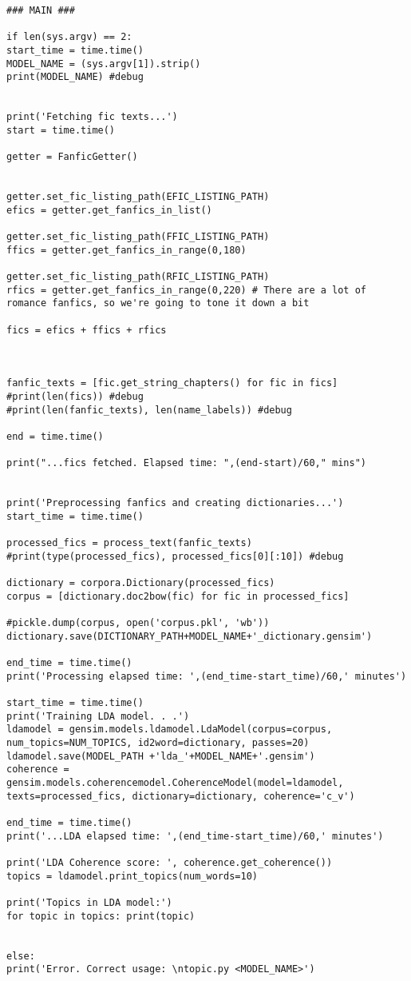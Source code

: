 \documentclass{pre-tfg}
\begin{document}
\begin{lstlisting}[style=consola]
### MAIN ###

if len(sys.argv) == 2:
start_time = time.time()
MODEL_NAME = (sys.argv[1]).strip()
print(MODEL_NAME) #debug


print('Fetching fic texts...')
start = time.time()

getter = FanficGetter()


getter.set_fic_listing_path(EFIC_LISTING_PATH)
efics = getter.get_fanfics_in_list()

getter.set_fic_listing_path(FFIC_LISTING_PATH)
ffics = getter.get_fanfics_in_range(0,180)

getter.set_fic_listing_path(RFIC_LISTING_PATH)
rfics = getter.get_fanfics_in_range(0,220) # There are a lot of romance fanfics, so we're going to tone it down a bit

fics = efics + ffics + rfics



fanfic_texts = [fic.get_string_chapters() for fic in fics]
#print(len(fics)) #debug
#print(len(fanfic_texts), len(name_labels)) #debug

end = time.time()

print("...fics fetched. Elapsed time: ",(end-start)/60," mins")


print('Preprocessing fanfics and creating dictionaries...')
start_time = time.time()

processed_fics = process_text(fanfic_texts)
#print(type(processed_fics), processed_fics[0][:10]) #debug

dictionary = corpora.Dictionary(processed_fics)
corpus = [dictionary.doc2bow(fic) for fic in processed_fics]

#pickle.dump(corpus, open('corpus.pkl', 'wb'))
dictionary.save(DICTIONARY_PATH+MODEL_NAME+'_dictionary.gensim')

end_time = time.time()
print('Processing elapsed time: ',(end_time-start_time)/60,' minutes')

start_time = time.time()
print('Training LDA model. . .')
ldamodel = gensim.models.ldamodel.LdaModel(corpus=corpus, num_topics=NUM_TOPICS, id2word=dictionary, passes=20)
ldamodel.save(MODEL_PATH +'lda_'+MODEL_NAME+'.gensim')
coherence = gensim.models.coherencemodel.CoherenceModel(model=ldamodel, texts=processed_fics, dictionary=dictionary, coherence='c_v')

end_time = time.time()
print('...LDA elapsed time: ',(end_time-start_time)/60,' minutes')

print('LDA Coherence score: ', coherence.get_coherence())
topics = ldamodel.print_topics(num_words=10)

print('Topics in LDA model:')
for topic in topics: print(topic)


else:
print('Error. Correct usage: \ntopic.py <MODEL_NAME>')

\end{lstlisting}
\end{document}
